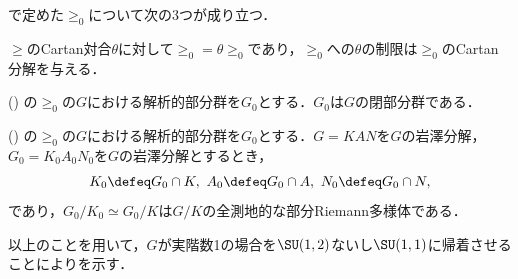 で定めた$\ge_0$について次の3つが成り立つ．
\begin{lem}\cite[p.~409, Lemma~2.2]{hel01}$\ge$のCartan対合$\theta$に対して$\ge_0 = \theta\ge_0$であり，$\ge_0 $への$\theta$の制限は$\ge_0$のCartan分解を与える．
\end{lem}

\begin{lem}(\cite[p.~82]{yos38}) の$\ge_0$の$G$における解析的部分群を$G_0$とする．$G_0 $は$G$の閉部分群である．
\end{lem}


\begin{lem}(\cite[p.~409, Lemma~2.3]{hel01}) の$\ge_0$の$G$における解析的部分群を$G_0$とする．$G = KAN$を$G$の岩澤分解，$G_0 = K_0A_0N_0$を$G$の岩澤分解とするとき，
  \begin{align*}
    K_0\defeq G_0\cap K,\ A_0 \defeq G_0\cap A,\ N_0\defeq G_0\cap N, 
  \end{align*}
  であり，$G_0/K_0 \simeq G_0/K$は$G/K$の全測地的な部分Riemann多様体である．
  
\end{lem}

以上のことを用いて，$G$が実階数1の場合を$\SU(1,2) $ないし$\SU(1,1) $に帰着させることによりを示す．

